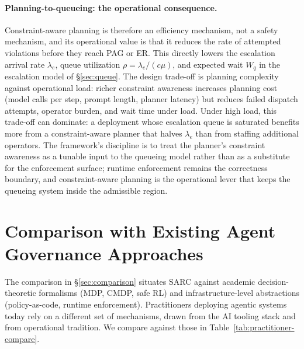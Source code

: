 \documentclass[11pt,a4paper]{article}
\theoremstyle{remark}
\begin{document}
\paragraph{Planning-to-queueing: the operational consequence.} Constraint-aware planning is therefore an efficiency mechanism, not a safety mechanism, and its operational value is that it reduces the rate of attempted violations before they reach PAG or ER. This directly lowers the escalation arrival rate $\lambda_e$, queue utilization $\rho = \lambda_e/(c\mu)$, and expected wait $W_q$ in the escalation model of \S\ref{sec:queue}. The design trade-off is planning complexity against operational load: richer constraint awareness increases planning cost (model calls per step, prompt length, planner latency) but reduces failed dispatch attempts, operator burden, and wait time under load. Under high load, this trade-off can dominate: a deployment whose escalation queue is saturated benefits more from a constraint-aware planner that halves $\lambda_e$ than from staffing additional operators. The framework's discipline is to treat the planner's constraint awareness as a tunable input to the queueing model rather than as a substitute for the enforcement surface; runtime enforcement remains the correctness boundary, and constraint-aware planning is the operational lever that keeps the queueing system inside the admissible region.

\section{Comparison with Existing Agent Governance Approaches}\label{sec:practitioner-compare}

The comparison in \S\ref{sec:comparison} situates SARC against academic decision-theoretic formalisms (MDP, CMDP, safe RL) and infrastructure-level abstractions (policy-as-code, runtime enforcement). Practitioners deploying agentic systems today rely on a different set of mechanisms, drawn from the AI tooling stack and from operational tradition. We compare against those in Table~\ref{tab:practitioner-compare}.
\end{document}
